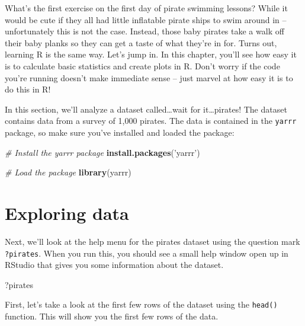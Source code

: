 \documentclass[]{book}
\newenvironment{Shaded}{\begin{snugshade}}{\end{snugshade}}
\newcommand{\KeywordTok}[1]{\textcolor[rgb]{0.13,0.29,0.53}{\textbf{{#1}}}}
\newcommand{\StringTok}[1]{\textcolor[rgb]{0.31,0.60,0.02}{{#1}}}
\newcommand{\CommentTok}[1]{\textcolor[rgb]{0.56,0.35,0.01}{\textit{{#1}}}}
\newcommand{\NormalTok}[1]{{#1}}
\theoremstyle{definition}
\theoremstyle{definition}
\theoremstyle{remark}
\begin{document}
What's the first exercise on the first day of pirate swimming lessons?
While it would be cute if they all had little inflatable pirate ships to
swim around in -- unfortunately this is not the case. Instead, those
baby pirates take a walk off their baby planks so they can get a taste
of what they're in for. Turns out, learning R is the same way. Let's
jump in. In this chapter, you'll see how easy it is to calculate basic
statistics and create plots in R. Don't worry if the code you're running
doesn't make immediate sense -- just marvel at how easy it is to do this
in R!

In this section, we'll analyze a dataset called\ldots{}wait for
it\ldots{}pirates! The dataset contains data from a survey of 1,000
pirates. The data is contained in the \texttt{yarrr} package, so make
sure you've installed and loaded the package:

\begin{Shaded}
\begin{Highlighting}[]
\CommentTok{# Install the yarrr package}
\KeywordTok{install.packages}\NormalTok{(}\StringTok{'yarrr'}\NormalTok{)}

\CommentTok{# Load the package}
\KeywordTok{library}\NormalTok{(yarrr)}
\end{Highlighting}
\end{Shaded}

\section{Exploring data}\label{exploring-data}

Next, we'll look at the help menu for the pirates dataset using the
question mark \texttt{?pirates}. When you run this, you should see a
small help window open up in RStudio that gives you some information
about the dataset.

\begin{Shaded}
\begin{Highlighting}[]
\NormalTok{?pirates}
\end{Highlighting}
\end{Shaded}

First, let's take a look at the first few rows of the dataset using the
\texttt{head()} function. This will show you the first few rows of the
data.
\end{document}
